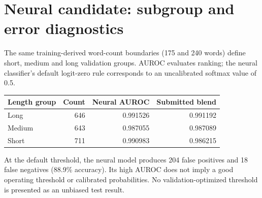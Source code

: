 \section*{Neural candidate: subgroup and error diagnostics}
The same training-derived word-count boundaries (175 and 240 words) define short, medium and long validation groups. AUROC evaluates ranking; the neural classifier's default logit-zero rule corresponds to an uncalibrated softmax value of 0.5.
\par\noindent
\begin{tabularx}{\linewidth}{@{}Yrrr@{}}\toprule
Length group & Count & Neural AUROC & Submitted blend\\\midrule
Long & 646 & 0.991526 & 0.991192 \\
Medium & 643 & 0.987055 & 0.987089 \\
Short & 711 & 0.990983 & 0.986215 \\
\bottomrule\end{tabularx}\par
At the default threshold, the neural model produces 204 false positives and 18 false negatives (88.9\% accuracy). Its high AUROC does not imply a good operating threshold or calibrated probabilities. No validation-optimized threshold is presented as an unbiased test result.


